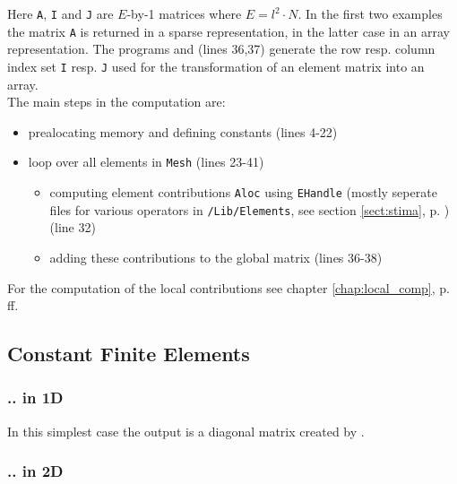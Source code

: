  Here {\tt A}, {\tt I} and {\tt J} are $E$-by-1 matrices where $E = l^2 \cdot N$. In the first two examples the matrix {\tt A} is returned in a sparse representation, in the latter case in an array representation. The programs  and  (lines 36,37) generate the row resp. column index set {\tt I} resp. {\tt J} used for the transformation of an element matrix into an array. \\

The main steps in the computation are:
\begin{itemize}
	\item prealocating memory and defining constants (lines 4-22)
	\item loop over all elements in {\tt Mesh} (lines 23-41)
	\begin{itemize}
		\item computing element contributions {\tt Aloc} using {\tt EHandle} (mostly seperate files for various operators in {\tt /Lib/Elements}, see section \ref{sect:stima}, p. \pageref{sect:stima}) (line 32)
		\item adding these contributions to the global matrix  (lines 36-38)
	\end{itemize}
\end{itemize}

For the computation of the local contributions see chapter \ref{chap:local_comp}, p. \pageref{chap:local_comp}ff.



\subsection{Constant Finite Elements} 

\subsubsection{.. in 1D}

In this simplest case the output is a diagonal matrix created by . 

\subsubsection{.. in 2D}

